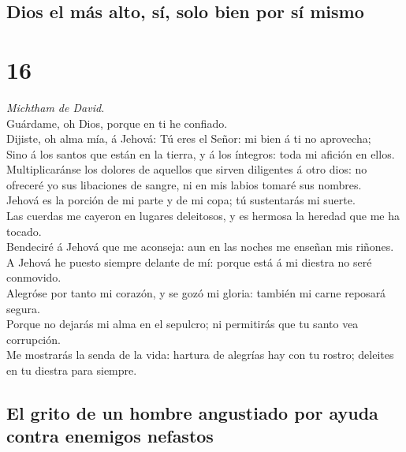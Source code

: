 \hypertarget{dios-el-muxe1s-alto-suxed-solo-bien-por-suxed-mismo}{%
\subsection{Dios el más alto, sí, solo bien por sí
mismo}\label{dios-el-muxe1s-alto-suxed-solo-bien-por-suxed-mismo}}

\hypertarget{section-15}{%
\section{16}\label{section-15}}

 \emph{Michtham de David.}\\
Guárdame, oh Dios, porque en ti he confiado.\\
 Dijiste, oh alma mía, á Jehová: Tú eres el Señor: mi bien á
ti no aprovecha;\\
 Sino á los santos que están en la tierra, y á los íntegros:
toda mi afición en ellos.\\
 Multiplicaránse los dolores de aquellos que sirven
diligentes á otro dios: no ofreceré yo sus libaciones de sangre, ni en
mis labios tomaré sus nombres.\\
 Jehová es la porción de mi parte y de mi copa; tú
sustentarás mi suerte.\\
 Las cuerdas me cayeron en lugares deleitosos, y es hermosa
la heredad que me ha tocado.\\
 Bendeciré á Jehová que me aconseja: aun en las noches me
enseñan mis riñones.\\
 A Jehová he puesto siempre delante de mí: porque está á mi
diestra no seré conmovido.\\
 Alegróse por tanto mi corazón, y se gozó mi gloria: también
mi carne reposará segura.\\
 Porque no dejarás mi alma en el sepulcro; ni permitirás
que tu santo vea corrupción.\\
 Me mostrarás la senda de la vida: hartura de alegrías hay
con tu rostro; deleites en tu diestra para siempre.

\hypertarget{el-grito-de-un-hombre-angustiado-por-ayuda-contra-enemigos-nefastos}{%
\subsection{El grito de un hombre angustiado por ayuda contra enemigos
nefastos}\label{el-grito-de-un-hombre-angustiado-por-ayuda-contra-enemigos-nefastos}}

